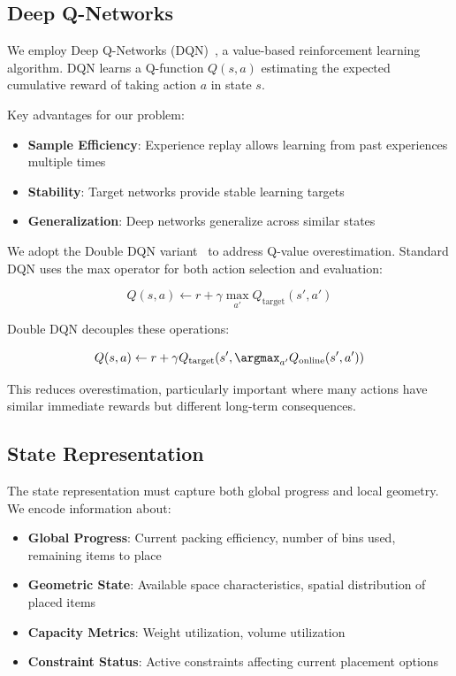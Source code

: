 \subsection{Deep Q-Networks}

We employ Deep Q-Networks (DQN)~\cite{mnih2015human}, a value-based reinforcement learning algorithm. DQN learns a Q-function $Q(s, a)$ estimating the expected cumulative reward of taking action $a$ in state $s$.

Key advantages for our problem:
\begin{itemize}
    \item \textbf{Sample Efficiency}: Experience replay allows learning from past experiences multiple times
    \item \textbf{Stability}: Target networks provide stable learning targets
    \item \textbf{Generalization}: Deep networks generalize across similar states
\end{itemize}

We adopt the Double DQN variant~\cite{van2016deep} to address Q-value overestimation. Standard DQN uses the max operator for both action selection and evaluation:

\begin{equation}
Q(s, a) \leftarrow r + \gamma \max_{a'} Q_{\text{target}}(s', a')
\end{equation}

Double DQN decouples these operations:

\begin{equation}
Q(s, a) \leftarrow r + \gamma Q_{\text{target}}(s', \argmax_{a'} Q_{\text{online}}(s', a'))
\end{equation}

This reduces overestimation, particularly important where many actions have similar immediate rewards but different long-term consequences.

\subsection{State Representation}

The state representation must capture both global progress and local geometry. We encode information about:

\begin{itemize}
    \item \textbf{Global Progress}: Current packing efficiency, number of bins used, remaining items to place
    \item \textbf{Geometric State}: Available space characteristics, spatial distribution of placed items
    \item \textbf{Capacity Metrics}: Weight utilization, volume utilization
    \item \textbf{Constraint Status}: Active constraints affecting current placement options
\end{itemize}

